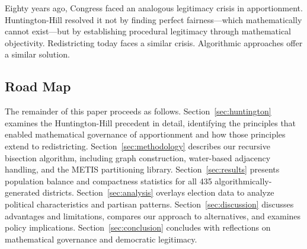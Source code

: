 Eighty years ago, Congress faced an analogous legitimacy crisis in apportionment. Huntington-Hill resolved it not by finding perfect fairness—which mathematically cannot exist—but by establishing procedural legitimacy through mathematical objectivity. Redistricting today faces a similar crisis. Algorithmic approaches offer a similar solution.

\subsection{Road Map}

The remainder of this paper proceeds as follows. Section~\ref{sec:huntington} examines the Huntington-Hill precedent in detail, identifying the principles that enabled mathematical governance of apportionment and how those principles extend to redistricting. Section~\ref{sec:methodology} describes our recursive bisection algorithm, including graph construction, water-based adjacency handling, and the METIS partitioning library. Section~\ref{sec:results} presents population balance and compactness statistics for all 435 algorithmically-generated districts. Section~\ref{sec:analysis} overlays election data to analyze political characteristics and partisan patterns. Section~\ref{sec:discussion} discusses advantages and limitations, compares our approach to alternatives, and examines policy implications. Section~\ref{sec:conclusion} concludes with reflections on mathematical governance and democratic legitimacy.
